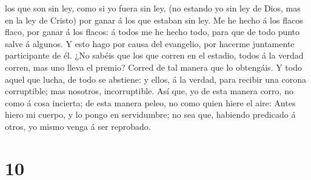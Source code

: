 los que son sin ley, como si yo fuera sin ley, (no estando yo sin ley de
Dios, mas en la ley de Cristo) por ganar á los que estaban sin ley.
 Me he hecho á los flacos flaco, por ganar á los flacos:
á todos me he hecho todo, para que de todo punto salve á algunos.
 Y esto hago por causa del evangelio, por hacerme
juntamente participante de él.  ¿No sabéis que los que
corren en el estadio, todos á la verdad corren, mas uno lleva el premio?
Corred de tal manera que lo obtengáis.  Y todo aquel que
lucha, de todo se abstiene: y ellos, á la verdad, para recibir una
corona corruptible; mas nosotros, incorruptible.  Así
que, yo de esta manera corro, no como á cosa incierta; de esta manera
peleo, no como quien hiere el aire:  Antes hiero mi
cuerpo, y lo pongo en servidumbre; no sea que, habiendo predicado á
otros, yo mismo venga á ser reprobado.

\hypertarget{section-9}{%
\section{10}\label{section-9}}

